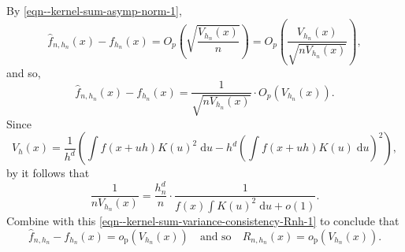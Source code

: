 By \eqref{eqn--kernel-sum-asymp-norm-1},
\begin{equation*}
  \widehat{f}_{n, h_{n}} (x) - f_{h_{n}} (x) = O_{p} \left(
  \sqrt{\frac{V_{h_{n}} (x)}{n}} \right) = O_{p} \left( \frac{V_{h_{n}}
  (x)}{\sqrt{n V_{h_{n}} (x)}} \right),
\end{equation*}
and so,
\begin{equation}
  \widehat{f}_{n, h_{n}} (x) - f_{h_{n}} (x) = \frac{1}{\sqrt{n V_{h_{n}} (x)}}
  \cdot O_{p} \left( V_{h_{n}} (x) \right).
  \label{eqn--kernel-sum-variance-consistency-Rnh-1}
\end{equation}
Since
\begin{equation}
  V_{h} (x) = \frac{1}{h^{d}} \left( \int f (x + u h) K (u)^{2} \;
  \mathrm{d} u - h^{d} \left( \int f (x + u h) K (u) \; \mathrm{d} u \right)^{2}
  \right),
  \label{eqn--Vh-expanded-form}
\end{equation}
by  it follows that
\begin{equation*}
  \frac{1}{n V_{h_{n}} (x)} = \frac{h_{n}^{d}}{n} \cdot \frac{1}{f (x) \int K
  (u)^{2} \; \mathrm{d} u + o (1)}.
\end{equation*}
Combine with this \eqref{eqn--kernel-sum-variance-consistency-Rnh-1}
to conclude that
\begin{equation}
  \widehat{f}_{n, h_{n}} - f_{h_{n}} (x) = o_{\mathrm{p}} \left( V_{h_{n}} (x)
  \right) \quad \text{and so} \quad R_{n, h_{n}} (x) = o_{\mathrm{p}} \left(
  V_{h_{n}} (x) \right).
  \label{eqn--kernel-sum-variance-consistency-Rnh}
\end{equation}

